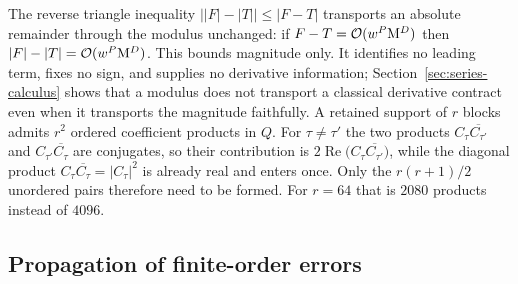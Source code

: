 \begin{remark}
\label{rem:modulus-transport}
The reverse triangle inequality $\bigl||F|-|T|\bigr|\le|F-T|$ transports an
absolute remainder through the modulus unchanged: if $F-T=\mathcal O(w^P\mathrm M^D)$ then
$|F|-|T|=\mathcal O(w^P\mathrm M^D)$. This bounds magnitude only. It identifies no leading
term, fixes no sign, and supplies no derivative information; Section~\ref{sec:series-calculus}
shows that a modulus does not transport a classical derivative contract even
when it transports the magnitude faithfully. A retained support of $r$ blocks
admits $r^2$ ordered coefficient products in $Q$. For $\tau\ne\tau'$ the two
products $C_\tau\overline{C_{\tau'}}$ and $C_{\tau'}\overline{C_\tau}$ are
conjugates, so their contribution is $2\operatorname{Re}\bigl(C_\tau\overline{C_{\tau'}}\bigr)$,
while the diagonal product $C_\tau\overline{C_\tau}=|C_\tau|^2$ is already real
and enters once. Only the $r(r+1)/2$ unordered pairs therefore need to be
formed. For $r=64$ that is $2080$ products instead of $4096$.
\end{remark}

\subsection{Propagation of finite-order errors}
\label{sec:evaluator}

